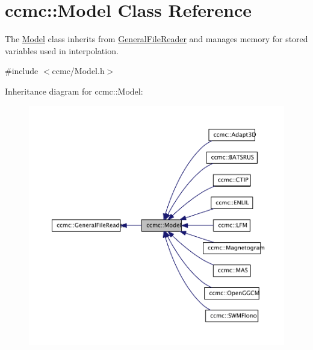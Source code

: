 \hypertarget{classccmc_1_1_model}{\section{ccmc\-:\-:Model Class Reference}
\label{classccmc_1_1_model}
}


The \hyperlink{classccmc_1_1_model}{Model} class inherits from \hyperlink{classccmc_1_1_general_file_reader}{General\-File\-Reader} and manages memory for stored variables used in interpolation.  




{\ttfamily \#include $<$ccmc/\-Model.\-h$>$}



Inheritance diagram for ccmc\-:\-:Model\-:\nopagebreak
\begin{figure}[H]
\begin{center}
\leavevmode
\includegraphics[width=350pt]{classccmc_1_1_model__inherit__graph}
\end{center}
\end{figure}


